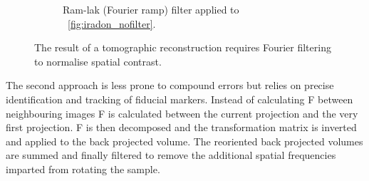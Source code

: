 \begin{figure}
\begin{subfigure}[t]{0.3\textwidth}
    \caption[Filtered iRadon]{Ram-lak (Fourier ramp) filter applied to \figurename~\ref{fig:iradon_nofilter}.}
    \label{fig:iradon_filter}
  \end{subfigure}
    \hfill
    \label{fig:irandons}
  \caption{The result of a tomographic reconstruction requires Fourier filtering to normalise spatial contrast.}
  \label{fig:irandons}
\end{figure}

The second approach is less prone to compound errors but relies on precise identification and tracking of fiducial markers.
Instead of calculating \gls{F} between neighbouring images \gls{F} is calculated between the current projection and the very first projection.
\gls{F} is then decomposed and the transformation matrix is inverted and applied to the back projected volume.
The reoriented back projected volumes are summed and finally filtered to remove the additional spatial frequencies imparted from rotating the sample.

